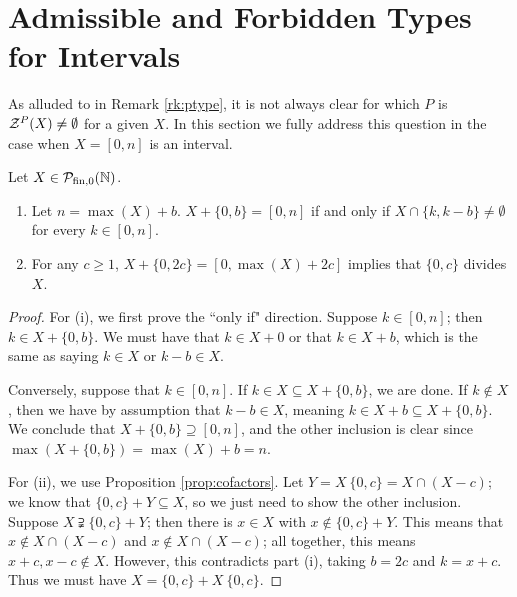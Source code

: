 \section{Admissible and Forbidden Types for Intervals} \label{sec:partitions and intervals}



As alluded to in Remark \ref{rk:ptype}, it is not always clear for which $P$ is $\mathcal{Z}^P(X) \neq \emptyset$ for a given $X$.
In this section we fully address this question in the case when $X = [0,n]$ is an interval.


\begin{prop} \label{prop:2-elt factor/cofactor}
	Let $X\in {\mathcal{P}_{\textrm{fin},0}(\mathbb{N})}$.
	\begin{enumerate}[label={\rm (\roman{*})}]
		\item Let $n = \max(X) + b$. $X + \{0,b\} = [ 0,n ]$ if and only if $X \cap \{k,k-b\} \neq \emptyset$ for every $k\in [ 0,n ]$.
		\item For any $c\ge 1$, $X + \{0,2c\} = [ 0,\max(X)+2c ]$ implies that $\{0,c\}$ divides $X$.
	\end{enumerate}
\end{prop}

\begin{proof}
	For (i), we first prove the ``only if" direction.  
	Suppose $k\in [ 0,n ]$; then $k\in X + \{0,b\}$.
	We must have that $k\in X + 0$ or that $k \in X + b$, which is the same as saying $k\in X$ or $k-b\in X$.
	
	Conversely, suppose that $k\in [ 0,n ]$.
	If $k\in X \subseteq X + \{0,b\}$, we are done.
	If $k\notin X$, then we have by assumption that $k-b\in X$, meaning $k\in X +b \subseteq X+ \{0,b\}$.
	We conclude that $X + \{0,b\} \supseteq [ 0,n ]$, and the other inclusion is clear since $\max(X+\{0,b\}) = \max(X) + b = n$.
	
	For (ii), we use Proposition \ref{prop:cofactors}.
	Let $Y = X\:\{0,c\} = X\cap (X-c)$; we know that $\{0,c\} + Y \subseteq X$, so we just need to show the other inclusion.
	Suppose $X \supsetneqq \{0,c\} + Y$; then there is $x\in X$ with $x\notin \{0,c\} + Y$.
	This means that $x\notin X \cap (X-c)$ and $x \notin X \cap (X-c)$; all together, this means $x+c,x-c\notin X$.
	However, this contradicts part (i), taking $b = 2c$ and $k = x+c$.
	Thus we must have $X = \{0,c\} + X\:\{0,c\}$.
\end{proof}

